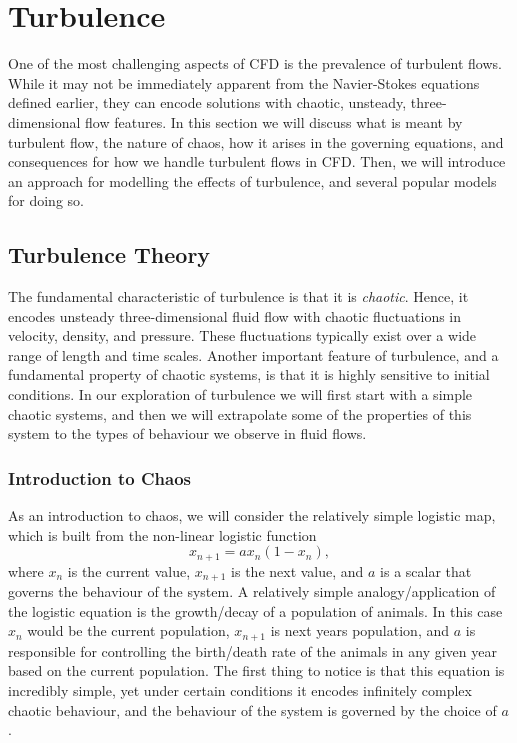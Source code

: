 \chapter{Turbulence}
One of the most challenging aspects of CFD is the prevalence of turbulent flows. While it may not be immediately apparent from the Navier-Stokes equations defined earlier, they can encode solutions with chaotic, unsteady, three-dimensional flow features. In this section we will discuss what is meant by turbulent flow, the nature of chaos, how it arises in the governing equations, and consequences for how we handle turbulent flows in CFD. Then, we will introduce an approach for modelling the effects of turbulence, and several popular models for doing so.

\section{Turbulence Theory}
The fundamental characteristic of turbulence is that it is {\it chaotic}. Hence, it encodes unsteady three-dimensional fluid flow with chaotic fluctuations in velocity, density, and pressure. These fluctuations typically exist over a wide range of length and time scales. Another important feature of turbulence, and a fundamental property of chaotic systems, is that it is highly sensitive to initial conditions. In our exploration of turbulence we will first start with a simple chaotic systems, and then we will extrapolate some of the properties of this system to the types of behaviour we observe in fluid flows.

\subsection{Introduction to Chaos}
As an introduction to chaos, we will consider the relatively simple logistic map, which is built from the non-linear logistic function
\begin{equation}
	x_{n+1} = ax_n(1-x_n),
\end{equation}
where $x_n$ is the current value, $x_{n+1}$ is the next value, and $a$ is a scalar that governs the behaviour of the system. A relatively simple analogy/application of the logistic equation is the growth/decay of a population of animals. In this case $x_n$ would be the current population, $x_{n+1}$ is next years population, and $a$ is responsible for controlling the birth/death rate of the animals in any given year based on the current population. The first thing to notice is that this equation is incredibly simple, yet under certain conditions it encodes infinitely complex chaotic behaviour, and the behaviour of the system is governed by the choice of $a$.

